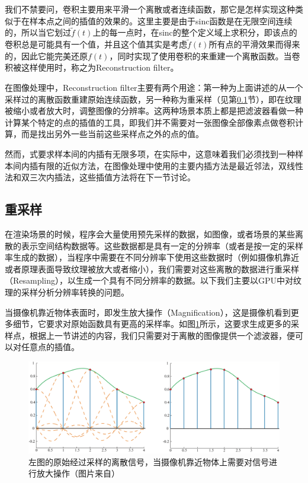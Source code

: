 我们不禁要问，卷积主要用来平滑一个离散或者连续函数，那它是怎样实现这种类似于在样本点之间的插值的效果的。这里主要是由于sinc函数是在无限空间连续的，所以当它划过$\tilde{f}(t)$上的每一点时，在sinc的整个定义域上求积分，即该点的卷积总是可能具有一个值，并且这个值其实是考虑$\tilde{f}(t)$所有点的平滑效果而得来的，因此它能完美还原$f(t)$，同时实现了使用卷积的来重建一个离散函数。当卷积被这样使用时，称之为Reconstruction filter。

在图像处理中，Reconstruction filter主要有两个用途：第一种为上面讲述的从一个采样过的离散函数重建原始连续函数，另一种称为重采样（见第\ref{sec:intro-resampling}节），即在纹理被缩小或者放大时，调整图像的分辨率。这两种场景本质上都是把滤波器看做一种计算某个特定的点的插值的工具，即我们并不需要对一张图像全部像素点做卷积计算，而是找出另外一些当前这些采样点之外的点的值。

然而，式要求样本间的内插有无限多项，在实际中，这意味着我们必须找到一种样本间内插有限的近似方法，在图像处理中使用的主要内插方法是最近邻法，双线性法和双三次内插法，这些插值方法将在下一节讨论。





\subsection{重采样}\label{sec:intro-resampling}
在渲染场景的时候，程序会大量使用预先采样的数据，如图像，或者场景的某些离散的表示空间结构数据等。这些数据都是具有一定的分辨率（或者是按一定的采样率生成的数据），当程序中需要在不同分辨率下使用这些数据时（例如摄像机靠近或者原理表面导致纹理被放大或者缩小），我们需要对这些离散的数据进行重采样（Resampling），以生成一个具有不同分辨率的数据。以下我们主要以GPU中对纹理的采样分析分辨率转换的问题。

当摄像机靠近物体表面时，即发生放大操作（Magnification），这是摄像机看到更多细节，它要求对原始函数具有更高的采样率。如图\ref{f:intro-magnification}所示，这要求生成更多的采样点，根据上一节讲述的内容，我们只需要对于离散的图像提供一个滤波器，便可以对任意点的插值。

\begin{figure}
	\includegraphics[width=1.\textwidth]{figures/intro/magnification}
	\caption{左图的原始经过采样的离散信号，当摄像机靠近物体上需要对信号进行放大操作（图片来自\cite{b:rtr}）}
	\label{f:intro-magnification}
\end{figure}

